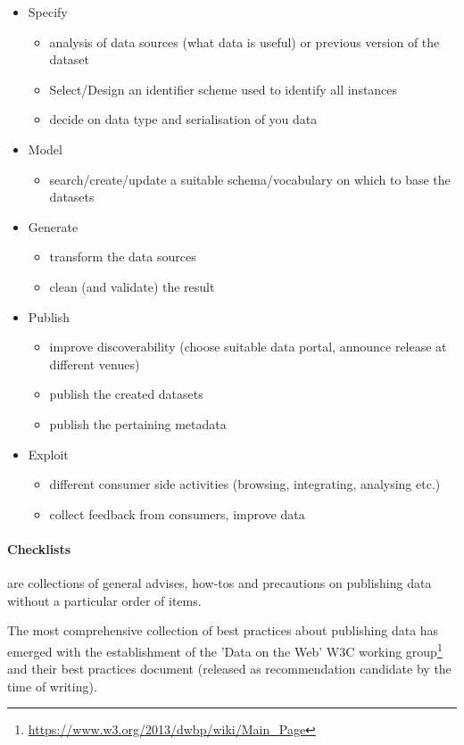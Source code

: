 \documentclass[a4paper,english,twoside,BCOR1.5cm,headsepline,DIV12,appendixprefix,final,12pt]{scrbook}
\newcommand\footnoteurl[1]{\footnote{\scriptsize\url{#1}}}
\begin{document}
\begin{itemize}
\item Specify
\begin{itemize}
\item analysis of data sources (what data is useful) or previous version of the dataset
\item Select/Design an identifier scheme used to identify all instances
\item decide on data type and serialisation of you data
\end{itemize}
\item Model
\begin{itemize}
\item search/create/update a suitable schema/vocabulary on which to base the datasets
\end{itemize}
\item Generate
\begin{itemize}
\item transform the data sources
\item clean (and validate) the result
\end{itemize}
\item Publish
\begin{itemize}
\item improve discoverability (choose suitable data portal, announce release at different venues)
\item publish the created datasets
\item publish the pertaining metadata
\end{itemize}
\item Exploit
\begin{itemize}
\item different consumer side activities (browsing, integrating, analysing etc.)
\item collect feedback from consumers, improve data
\end{itemize}
\end{itemize}

\paragraph{Checklists} are collections of general advises, how-tos and precautions on publishing data without a particular order of items. 

The most comprehensive collection of best practices about publishing data has emerged with the establishment  
of the 'Data on the Web' W3C working group\footnoteurl{https://www.w3.org/2013/dwbp/wiki/Main_Page} and their best practices document \cite{dwbpW3C2016} (released as recommendation candidate by the time of writing). 
\end{document}
